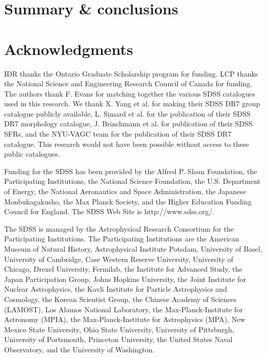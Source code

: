 \documentclass[a4paper,fleqn,usenatbib]{mnras}
\begin{document}
\section{Summary \& conclusions}
\label{sec:summary} 


\section*{Acknowledgments}
\label{sec:acknowledgments}

IDR thanks the Ontario Graduate Scholarship program for funding.  LCP
thanks the National Science and Engineering Research
Council of Canada for funding.  The authors thank
F. Evans for matching together the various SDSS catalogues used in
this research.  We thank X. Yang et al. for
making their
SDSS DR7 group catalogue publicly available, L. Simard et al. for the
publication of their SDSS DR7 morphology catalogue, J. Brinchmann et al. for
publication of their SDSS SFRs, and the NYU-VAGC
team for the 
publication of their SDSS DR7 catalogue.  This research would not have
been possible without access to these public catalogues.
\par
Funding for the SDSS has been provided by the Alfred P. Sloan
Foundation, the Participating Institutions, the National Science
Foundation, the U.S. Department of Energy, the National Aeronautics
and Space Administration, the Japanese Monbukagakusho, the Max Planck
Society, and the Higher Education Funding Council for England. The
SDSS Web Site is http://www.sdss.org/.
\par
The SDSS is managed by the Astrophysical Research Consortium for the
Participating Institutions. The Participating Institutions are the
American Museum of Natural History, Astrophysical Institute Potsdam,
University of Basel, University of Cambridge, Case Western Reserve
University, University of Chicago, Drexel University, Fermilab, the
Institute for Advanced Study, the Japan Participation Group, Johns
Hopkins University, the Joint Institute for Nuclear Astrophysics, the
Kavli Institute for Particle Astrophysics and Cosmology, the Korean
Scientist Group, the Chinese Academy of Sciences (LAMOST), Los Alamos
National Laboratory, the Max-Planck-Institute for Astronomy (MPIA),
the Max-Planck-Institute for Astrophysics (MPA), New Mexico State
University, Ohio State University, University of Pittsburgh,
University of Portsmouth, Princeton University, the United States
Naval Observatory, and the University of Washington.
\end{document}
